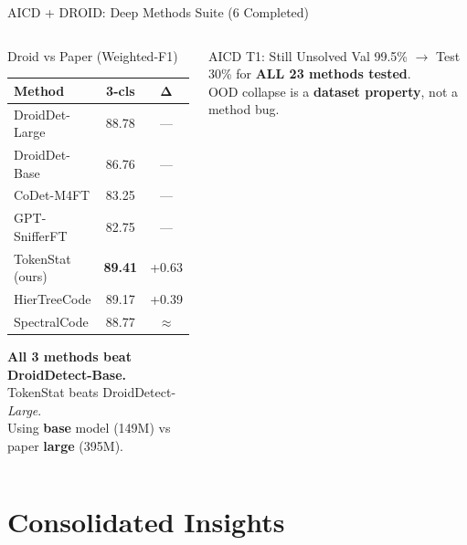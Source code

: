 \documentclass[aspectratio=169, 10pt]{beamer}
\begin{document}
\begin{frame}{AICD + DROID: Deep Methods Suite (6 Completed)}
\begin{columns}[T]
\begin{block}{Droid vs Paper (Weighted-F1)}
\centering\footnotesize
\begin{tabular}{lcc}
\toprule
\textbf{Method} & \textbf{3-cls} & $\boldsymbol{\Delta}$ \\
\midrule
DroidDet-Large & 88.78 & --- \\
DroidDet-Base & 86.76 & --- \\
CoDet-M4FT & 83.25 & --- \\
GPT-SnifferFT & 82.75 & --- \\
\midrule
\rowcolor{oursgreen}
TokenStat (ours) & \textbf{89.41} & \textcolor{softgreen}{+0.63} \\
\rowcolor{oursgreen}
HierTreeCode & 89.17 & \textcolor{softgreen}{+0.39} \\
SpectralCode & 88.77 & $\approx$ \\
\bottomrule
\end{tabular}

\vspace{3pt}
{\scriptsize \textbf{All 3 methods beat DroidDetect-Base.}\\
TokenStat beats DroidDetect-\emph{Large}.\\
Using \textbf{base} model (149M) vs paper \textbf{large} (395M).}
\end{block}

\begin{block}{\scriptsize AICD T1: Still Unsolved}
\scriptsize
Val 99.5\% $\to$ Test 30\% for \textbf{ALL 23 methods tested}.\\
OOD collapse is a \textbf{dataset property}, not a method bug.
\end{block}
\end{columns}
\end{frame}


\section{Consolidated Insights}
\end{document}
